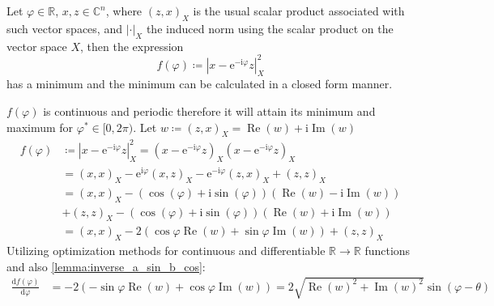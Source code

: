 	\begin{Prop}\label{theorem:min distance}
		Let $\varphi \in \mathbb{R}$, $x,z \in \mathbb{C}^n$, where $(z,x)_X$ is 
		the usual scalar product associated with such vector spaces, and $\left|\cdot\right|_X$ the induced norm using the scalar product on the vector space $X$, then the expression
		\begin{equation}\label{eq:loss_function}
			f(\varphi) \coloneqq \left|x-\mathrm{e}^{-\mathrm{i}\varphi}z\right|^2_X
		\end{equation}
		has a minimum and the minimum can be calculated in a closed form manner.
		\end{Prop}
		\begin{Proof}
			$f(\varphi)$ is continuous and periodic therefore it will attain its minimum and maximum for $\varphi^\ast \in [0,2\pi)$\cite{Rudin1976}. 
			Let $w \coloneqq (z,x)_X = \operatorname{Re}(w)+\mathrm{i}\operatorname{Im}(w)$
			\begin{equation}
				\begin{split}
				f(\varphi) &\coloneqq \left|x-\mathrm{e}^{-\mathrm{i}\varphi}z\right|^2_X = 
				\left(x-\mathrm{e}^{-\mathrm{i}\varphi}z\right)_X\left(x-\mathrm{e}^{-\mathrm{i}\varphi}z\right)_X\\
						   &= \left(x,x\right)_X - \mathrm{e}^{\mathrm{i}\varphi}\left(x,z\right)_X-\mathrm{e}^{-\mathrm{i}\varphi}\left(z,x\right)_X+\left(z,z\right)_X \\
                		   &= \left(x,x\right)_X - (\cos(\varphi)+\mathrm{i}\sin(\varphi))\left(\operatorname{Re}(w) -\mathrm{i}\operatorname{Im}(w)\right)\\
						   &+ \left(z,z\right)_X - (\cos(\varphi)+\mathrm{i}\sin(\varphi))\left(\operatorname{Re}(w) +\mathrm{i}\operatorname{Im}(w)\right)\\
						   &= \left(x,x\right)_X - 2\left(\cos\varphi\operatorname{Re}(w)+\sin\varphi\operatorname{Im}(w)\right)+ \left(z,z\right)_X
				\end{split}
			  \end{equation}
			  Utilizing optimization methods for continuous and differentiable $\mathbb{R} \rightarrow \mathbb{R}$ functions \cite{Boyd2004}\cite{Nocedal2006} and also \cref{lemma:inverse_a_sin_b_cos}:
			  \begin{equation}
				\begin{split}
				\frac{\mathrm{d}f(\varphi)}{\mathrm{d}\varphi} &= - 2\left(-\sin\varphi\operatorname{Re}(w)+\cos\varphi\operatorname{Im}(w)\right) = 2\sqrt{\operatorname{Re}(w)^2+\operatorname{Im}(w)^2}\sin(\varphi-\theta)\\ 

\end{split}
\end{equation}
\end{Proof}
